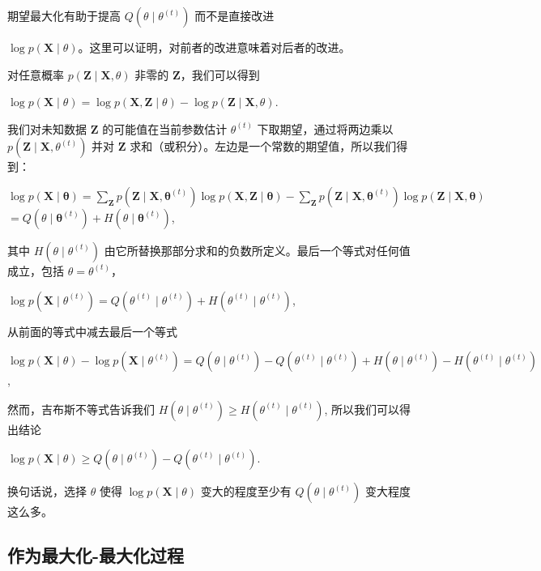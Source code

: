期望最大化有助于提高 $Q(\theta \mid \theta^{(t)})$ 而不是直接改进 

$\log p(\mathbf{X} \mid \theta)$。这里可以证明，对前者的改进意味着对后者的改进。

对任意概率 $p(\mathbf{Z} \mid \mathbf{X}, \theta)$ 非零的 $\mathbf{Z}$，我们可以得到

$\log p(\mathbf{X} \mid \theta) = \log p(\mathbf{X}, \mathbf{Z} \mid \theta) - \log p(\mathbf{Z} \mid \mathbf{X}, \theta)$.

我们对未知数据 $\mathbf{Z}$ 的可能值在当前参数估计 $\theta^{(t)}$ 下取期望，通过将两边乘以 $p(\mathbf{Z} \mid \mathbf{X}, \theta^{(t)}) $ 并对 $\mathbf{Z}$ 求和（或积分）。左边是一个常数的期望值，所以我们得到：


$\log p(\mathbf{X} \mid \boldsymbol{\theta}) = \sum_{\mathbf{Z}} p(\mathbf{Z} \mid \mathbf{X}, \boldsymbol{\theta}^{(t)}) \log p(\mathbf{X}, \mathbf{Z} \mid \boldsymbol{\theta}) - \sum_{\mathbf{Z}} p(\mathbf{Z} \mid \mathbf{X}, \boldsymbol{\theta}^{(t)}) \log p(\mathbf{Z} \mid \mathbf{X}, \boldsymbol{\theta})$ \\

$= Q(\theta \mid \boldsymbol{\theta}^{(t)}) + H(\theta \mid \boldsymbol{\theta}^{(t)})$,

其中 $H(\theta \mid \theta^{(t)})$ 由它所替换那部分求和的负数所定义。最后一个等式对任何值成立，包括 $\theta = \theta^{(t)}$，

$\log p(\mathbf{X} \mid \theta^{(t)}) = Q(\theta^{(t)} \mid \theta^{(t)}) + H(\theta^{(t)} \mid \theta^{(t)})$,

从前面的等式中减去最后一个等式

$\log p(\mathbf{X} \mid \theta) - \log p(\mathbf{X} \mid \theta^{(t)}) = Q(\theta \mid \theta^{(t)}) - Q(\theta^{(t)} \mid \theta^{(t)}) + H(\theta \mid \theta^{(t)}) - H(\theta^{(t)} \mid \theta^{(t)})$,

然而，吉布斯不等式告诉我们 $H(\theta \mid \theta^{(t)})\geq H(\theta^{(t)} \mid \theta^{(t)})$, 所以我们可以得出结论

$\log p(\mathbf{X} \mid \theta) \geq Q(\theta \mid \theta^{(t)}) - Q(\theta^{(t)} \mid \theta^{(t)})$.

换句话说，选择 $\theta$ 使得 $\log p(\mathbf{X} \mid \theta)$ 变大的程度至少有 $Q(\theta \mid \theta^{(t)})$ 变大程度这么多。

\subsection{作为最大化-最大化过程}


